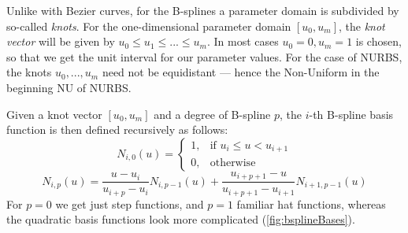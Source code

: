 Unlike with Bezier curves, for the B-splines a parameter domain is subdivided by so-called \textit{knots}. For the one-dimensional parameter domain $[u_{0}, u_{m}]$, the \textit{knot vector} will be given by $u_{0} \leq u_{1} \leq ... \leq u_{m}$. In most cases $u_{0} = 0, u_{m} = 1$ is chosen, so that we get the unit interval for our parameter values. For the case of NURBS, the knots $u_{0},..., u_{m}$ need not be equidistant --- hence the Non-Uniform in the beginning NU of NURBS.

Given a knot vector $[u_{0}, u_{m}]$ and a degree of B-spline $p$, the $i$-th B-spline basis function is then defined recursively as follows:
\begin{equation}
N_{i,0}(u) =  \begin{cases} 1, & \mbox{if } u_{i} \leq u < u_{i+1} \\ 0, & \mbox{otherwise } \end{cases}
\end{equation} 
\begin{equation}
N_{i,p}(u) = \frac{u - u_{i}}{u_{i+p} - u_{i}}N_{i, p-1}(u)  + \frac{u_{i+p+1}-u}{u_{i+p+1} - u_{i+1}}N_{i+1, p-1}(u)
\end{equation}
For $p=0$ we get just step functions, and $p=1$ familiar hat functions, whereas the quadratic basis functions look more complicated (\autoref{fig:bsplineBases}).
